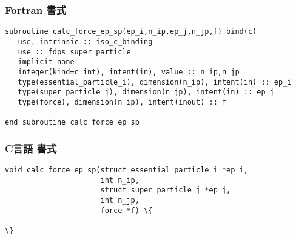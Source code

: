 \subsubsection*{Fortran 書式}
\begin{screen}
\begin{Verbatim}[commandchars=\\\{\}]
subroutine calc_force_ep_sp(ep_i,n_ip,ep_j,n_jp,f) bind(c)
   use, intrinsic :: iso_c_binding
   use :: fdps_super_particle
   implicit none
   integer(kind=c_int), intent(in), value :: n_ip,n_jp
   type(essential_particle_i), dimension(n_ip), intent(in) :: ep_i
   type(super_particle_j), dimension(n_jp), intent(in) :: ep_j
   type(force), dimension(n_ip), intent(inout) :: f
   
end subroutine calc_force_ep_sp
\end{Verbatim}
\end{screen}

\subsubsection*{C言語 書式}
\begin{screen}
\begin{Verbatim}[commandchars=\\\{\}]
void calc_force_ep_sp(struct essential_particle_i *ep_i,
                      int n_ip,
                      struct super_particle_j *ep_j,
                      int n_jp,
                      force *f) \{
   
\}
\end{Verbatim}
\end{screen}

